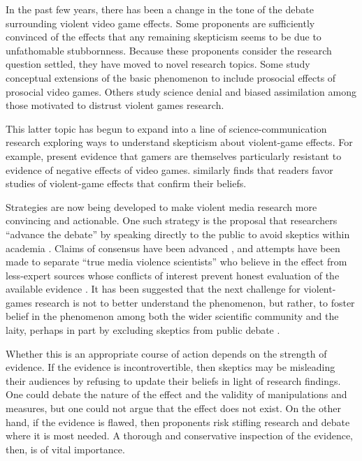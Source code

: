 \documentclass[man]{apa6}
\begin{document}
In the past few years, there has been a change in the tone of the debate surrounding violent video game effects. Some proponents are sufficiently convinced of the effects that any remaining skepticism seems to be due to unfathomable stubbornness. Because these proponents consider the research question settled, they have moved to novel research topics. Some study conceptual extensions of the basic phenomenon to include prosocial effects of prosocial video games. Others study science denial and biased assimilation among those motivated to distrust violent games research. 

This latter topic has begun to expand into a line of science-communication research exploring ways to understand skepticism about violent-game effects.   For example, \citet{Nauroth:etal:2014} present evidence that gamers are themselves particularly resistant to evidence of negative effects of video games. \citet{Greitemeyer:2014} similarly finds that readers favor studies of violent-game effects that confirm their beliefs. 

Strategies are now being developed to make violent media research more convincing and actionable. One such strategy is the proposal that researchers ``advance the debate'' by speaking directly to the public to avoid skeptics within academia \citep{Strasburger:Donnerstein:2014}. Claims of consensus have been advanced \citep{Bushman:etal:2014}, and attempts have been made to separate ``true media violence scientists'' who believe in the effect from less-expert sources whose conflicts of interest prevent honest evaluation of the available evidence \citep{Anderson:etal:2014}. It has been suggested that the next challenge for violent-games research is not to better understand the phenomenon, but rather, to foster belief in the phenomenon among both the wider scientific community and the laity, perhaps in part by excluding skeptics from public debate \citep{Anderson:etal:2014}.

Whether this is an appropriate course of action depends on the strength of evidence. If the evidence is incontrovertible, then skeptics may be misleading their audiences by refusing to update their beliefs in light of research findings. One could debate the nature of the effect and the validity of manipulations and measures, but one could not argue that the effect does not exist. On the other hand, if the evidence is flawed, then proponents risk stifling research and debate where it is most needed. A thorough and conservative inspection of the evidence, then, is of vital importance.
\end{document}
